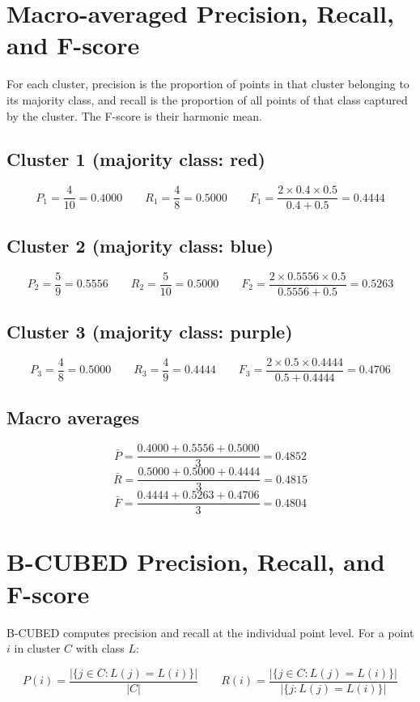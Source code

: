 \documentclass[11pt]{article}
\begin{document}
\section{Macro-averaged Precision, Recall, and F-score}

For each cluster, precision is the proportion of points in that cluster belonging to its majority class, and recall is the proportion of all points of that class captured by the cluster. The F-score is their harmonic mean.

\subsection*{Cluster 1 (majority class: red)}
\[
P_1 = \frac{4}{10} = 0.4000 \qquad
R_1 = \frac{4}{8}  = 0.5000 \qquad
F_1 = \frac{2 \times 0.4 \times 0.5}{0.4 + 0.5} = 0.4444
\]

\subsection*{Cluster 2 (majority class: blue)}
\[
P_2 = \frac{5}{9}  = 0.5556 \qquad
R_2 = \frac{5}{10} = 0.5000 \qquad
F_2 = \frac{2 \times 0.5556 \times 0.5}{0.5556 + 0.5} = 0.5263
\]

\subsection*{Cluster 3 (majority class: purple)}
\[
P_3 = \frac{4}{8} = 0.5000 \qquad
R_3 = \frac{4}{9} = 0.4444 \qquad
F_3 = \frac{2 \times 0.5 \times 0.4444}{0.5 + 0.4444} = 0.4706
\]

\subsection*{Macro averages}
\[
\bar{P} = \frac{0.4000 + 0.5556 + 0.5000}{3} = 0.4852
\]
\[
\bar{R} = \frac{0.5000 + 0.5000 + 0.4444}{3} = 0.4815
\]
\[
\bar{F} = \frac{0.4444 + 0.5263 + 0.4706}{3} = 0.4804
\]

\section{B-CUBED Precision, Recall, and F-score}

B-CUBED computes precision and recall at the individual point level. For a point $i$ in cluster $C$ with class $L$:

\[
P(i) = \frac{|\{j \in C : L(j) = L(i)\}|}{|C|}
\qquad
R(i) = \frac{|\{j \in C : L(j) = L(i)\}|}{|\{j : L(j) = L(i)\}|}
\]
\end{document}
